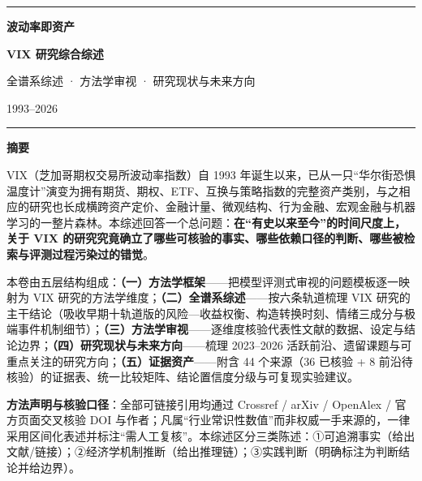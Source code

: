 \documentclass[11pt,a4paper]{article}
\begin{document}
\begin{titlepage}
\centering
\vspace*{1.2cm}
{\color{headblue}\rule{0.92\textwidth}{0.7pt}}\par
\vspace{2.0em}
{\Huge\bfseries\color{headblue} 波动率即资产\par}
\vspace{0.55em}
{\LARGE\bfseries VIX 研究综合综述\par}
\vspace{0.9em}
{\large\color{black!60} 全谱系综述 · 方法学审视 · 研究现状与未来方向\par}
{\normalsize\color{black!60} 1993--2026\par}
\vspace{1.8em}
{\color{headblue}\rule{0.92\textwidth}{0.7pt}}\par
\vspace{1.8em}
\setlength{\fboxsep}{1.4em}
\colorbox{headblue!8}{%
\begin{minipage}{0.84\textwidth}
\vspace{0.2em}
{\large\bfseries\color{headblue} 摘要\par}
\vspace{0.3em}
\normalsize
VIX（芝加哥期权交易所波动率指数）自 1993 年诞生以来，已从一只“华尔街恐惧温度计”演变为拥有期货、期权、ETF、互换与策略指数的完整资产类别，与之相应的研究也长成横跨资产定价、金融计量、微观结构、行为金融、宏观金融与机器学习的一整片森林。本综述回答一个总问题：\textbf{在“有史以来至今”的时间尺度上，关于 VIX 的研究究竟确立了哪些可核验的事实、哪些依赖口径的判断、哪些被检索与评测过程污染过的错觉}。

本卷由五层结构组成：\textbf{（一）方法学框架}——把模型评测式审视的问题模板逐一映射为 VIX 研究的方法学维度；\textbf{（二）全谱系综述}——按六条轨道梳理 VIX 研究的主干结论（吸收早期十轨道版的风险—收益权衡、构造转换时刻、情绪三成分与极端事件机制细节）；\textbf{（三）方法学审视}——逐维度核验代表性文献的数据、设定与结论边界；\textbf{（四）研究现状与未来方向}——梳理 2023--2026 活跃前沿、遗留课题与可重点关注的研究方向；\textbf{（五）证据资产}——附含 44 个来源（36 已核验 + 8 前沿待核验）的证据表、统一比较矩阵、结论置信度分级与可复现实验建议。

\textbf{方法声明与核验口径}：全部可链接引用均通过 Crossref / arXiv / OpenAlex / 官方页面交叉核验 DOI 与作者；凡属“行业常识性数值”而非权威一手来源的，一律采用区间化表述并标注“需人工复核”。本综述区分三类陈述：①可追溯事实（给出文献/链接）；②经济学机制推断（给出推理链）；③实践判断（明确标注为判断结论并给边界）。
\end{minipage}}
\vfill
\end{titlepage}
\end{document}
